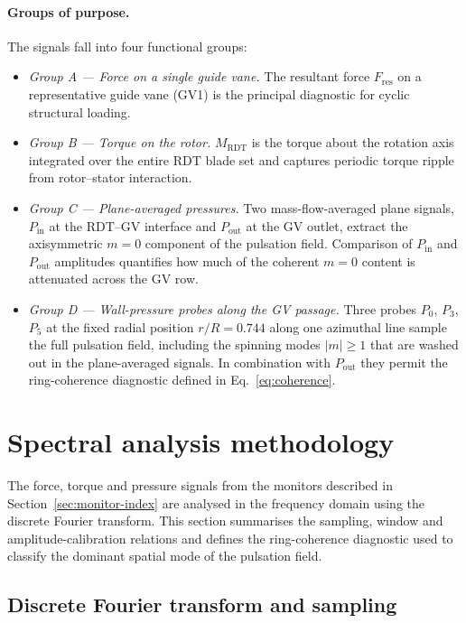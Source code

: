 \paragraph{Groups of purpose.}
The signals fall into four functional groups:
\begin{itemize}
  \item \emph{Group A — Force on a single guide vane.} The resultant force $F_{\mathrm{res}}$ on a representative guide vane (GV1) is the principal diagnostic for cyclic structural loading.
  \item \emph{Group B — Torque on the rotor.} $M_{\mathrm{RDT}}$ is the torque about the rotation axis integrated over the entire RDT blade set and captures periodic torque ripple from rotor--stator interaction.
  \item \emph{Group C — Plane-averaged pressures.} Two mass-flow-averaged plane signals, $P_{\mathrm{in}}$ at the RDT--GV interface and $P_{\mathrm{out}}$ at the GV outlet, extract the axisymmetric $m=0$ component of the pulsation field. Comparison of $P_{\mathrm{in}}$ and $P_{\mathrm{out}}$ amplitudes quantifies how much of the coherent $m=0$ content is attenuated across the GV row.
  \item \emph{Group D — Wall-pressure probes along the GV passage.} Three probes $P_0$, $P_3$, $P_5$ at the fixed radial position $r/R = 0.744$ along one azimuthal line sample the full pulsation field, including the spinning modes $|m|\geq 1$ that are washed out in the plane-averaged signals. In combination with $P_{\mathrm{out}}$ they permit the ring-coherence diagnostic defined in Eq.~\eqref{eq:coherence}.
\end{itemize}
 
\section{Spectral analysis methodology}
\label{sec:spec}
 
The force, torque and pressure signals from the monitors described in Section~\ref{sec:monitor-index} are analysed in the frequency domain using the discrete Fourier transform. This section summarises the sampling, window and amplitude-calibration relations and defines the ring-coherence diagnostic used to classify the dominant spatial mode of the pulsation field.
 
\subsection{Discrete Fourier transform and sampling}
\label{sec:spec-dft}
 
